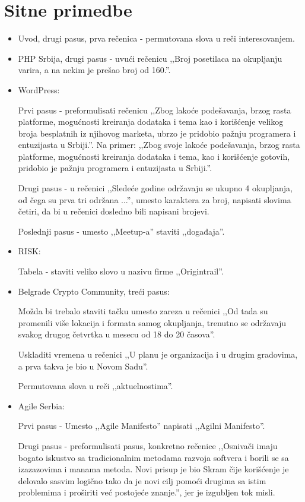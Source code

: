 \documentclass[a4paper]{report}
\begin{document}
\section{Sitne primedbe}
\begin{itemize}
    \item Uvod, drugi pasus, prva rečenica - permutovana slova u reči interesovanjem.
    \item PHP Srbija, drugi pasus - uvući rečenicu ,,Broj posetilaca na okupljanju varira, a na nekim je prešao broj od 160.''.
    \item WordPress:
    
    Prvi pasus - preformulisati rečenicu ,,Zbog lakoće podešavanja, brzog rasta platforme, mogućnosti kreiranja dodataka i tema kao i korišćenje velikog broja besplatnih iz njihovog marketa, ubrzo je pridobio pažnju programera i entuzijasta u Srbiji.''. Na primer: ,,Zbog svoje lakoće podešavanja, brzog rasta platforme, mogućnosti kreiranja dodataka i tema, kao i korišćenje gotovih, pridobio je pažnju programera i  entuzijasta u Srbiji.''.
    
    Drugi pasus - u rečenici ,,Sledeće godine održavaju se ukupno 4 okupljanja, od čega su prva tri održana ...'', umesto karaktera za broj, napisati slovima četiri, da bi u rečenici dosledno bili napisani brojevi.
    
     Poslednji pasus - umesto ,,Meetup-a'' staviti ,,događaja''.
    \item RISK:
    
    Tabela - staviti veliko slovo u nazivu firme ,,Origintrail''.
    
    \item Belgrade Crypto Community, treći pasus:
    
    Možda bi trebalo staviti tačku umesto zareza u rečenici ,,Od tada su promenili više lokacija i formata samog okupljanja, trenutno se održavaju svakog drugog četvrtka u mesecu od 18 do 20 časova''.
    
    Uskladiti vremena u rečenici ,,U planu je organizacija i u drugim gradovima, a prva takva je bio u Novom Sadu''.
    
    Permutovana slova u reči ,,aktuelnostima''.
    \item Agile Serbia:
    
    Prvi pasus - Umesto ,,Agile Manifesto'' napisati ,,Agilni Manifesto''.
    
    Drugi pasus -  preformulisati pasus, konkretno rečenice ,,Osnivači imaju bogato iskustvo sa tradicionalnim metodama razvoja softvera i borili se sa izazazovima i manama metoda. Novi prisup je bio Skram čije korišćenje je delovalo sasvim logično tako da je novi cilj pomoći drugima sa istim problemima i proširiti već postojeće znanje.'', jer je izgubljen tok misli.
    

\end{itemize}
\end{document}
